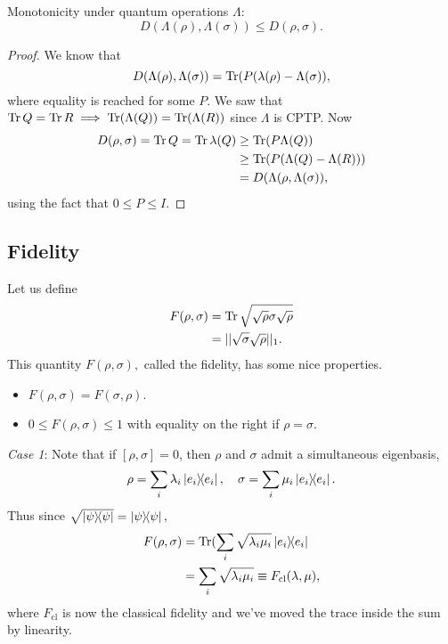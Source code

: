 \begin{lem}
    Monotonicity under quantum operations $\Lambda$:
    \begin{equation}
        D(\Lambda(\rho),\Lambda(\sigma))\leq D(\rho,\sigma).
    \end{equation}
\end{lem}
\begin{proof}
    We know that
    \begin{equation*}
        D(\Lambda(\rho),\Lambda(\sigma))=\operatorname{Tr} (P(\lambda(\rho)-\Lambda(\sigma)),
    \end{equation*}
    where equality is reached for some $P$.
    We saw that $\operatorname{Tr} Q = \operatorname{Tr} R\implies \operatorname{Tr} (\Lambda(Q)) =\operatorname{Tr} (\Lambda(R))$ since $\Lambda$ is CPTP. Now
    \begin{align*}
        D(\rho,\sigma) = \operatorname{Tr} Q = \operatorname{Tr} \lambda(Q) &\geq \operatorname{Tr}(P \Lambda (Q))\\
        &\geq \operatorname{Tr} (P(\Lambda(Q)-\Lambda(R)))\\
        &= D(\Lambda(\rho, \Lambda(\sigma)),
    \end{align*}
    using the fact that $0\leq P \leq I.$
\end{proof}
\subsection*{Fidelity}
Let us define
\begin{align}
    F(\rho,\sigma) &= \operatorname{Tr} \sqrt{\sqrt{\rho}\sigma \sqrt{\rho}}\\
        &= ||\sqrt{\sigma}\sqrt{\rho}||_1.
\end{align}
This quantity $F(\rho,\sigma),$ called the fidelity, has some nice properties.
\begin{itemize}
    \item $F(\rho,\sigma)=F(\sigma,\rho)$.
    \item $0\leq F(\rho,\sigma)\leq 1$ with equality on the right if $\rho=\sigma$.
\end{itemize}
\textit{Case 1}: Note that if $[\rho,\sigma]=0$, then $\rho$ and $\sigma$ admit a simultaneous eigenbasis,
\begin{equation*}
    \rho=\sum_i \lambda_i \left\lvert{e_i}\middle\rangle\!\middle\langle{e_i}\right\rvert,\quad \sigma=\sum_i \mu_i \left\lvert{e_i}\middle\rangle\!\middle\langle{e_i}\right\rvert.
\end{equation*}
Thus since $\sqrt{\left\lvert{\psi}\middle\rangle\!\middle\langle{\psi}\right\rvert}=\left\lvert{\psi}\middle\rangle\!\middle\langle{\psi}\right\rvert,$
\begin{align}
    F(\rho,\sigma)&=\operatorname{Tr} (\sum_i \sqrt{\lambda_i \mu_i} \left\lvert{e_i}\middle\rangle\!\middle\langle{e_i}\right\rvert\\
    &=\sum_i \sqrt{\lambda_i \mu_i} \equiv F_{\text{cl}}(\lambda,\mu),
\end{align}
where $F_{\text{cl}}$ is now the classical fidelity and we've moved the trace inside the sum by linearity.

